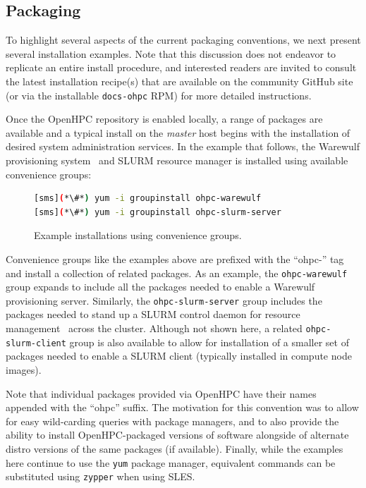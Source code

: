 \documentclass{sig-alternate-05-2015}
\begin{document}
\subsection{Packaging} \label{sec:packaging}

To highlight several aspects of the current packaging conventions, we next
present several installation examples. Note that this
discussion does not endeavor to replicate an entire install procedure, and
interested readers are invited to consult the latest installation recipe(s) that
are available on the community GitHub site (or via the installable
\texttt{docs-ohpc} RPM) for more detailed instructions.

Once the OpenHPC repository is enabled locally, a range of packages are
available and a typical install on the {\em master} host begins with the
installation of desired system administration services. In the example that
follows, the Warewulf provisioning system~\cite{warewulf_url} and SLURM
resource manager is installed using available convenience groups:

\begin{figure}[h]
\begin{lstlisting}[language=bash,keywords={}]
[sms](*\#*) yum -i groupinstall ohpc-warewulf
[sms](*\#*) yum -i groupinstall ohpc-slurm-server
\end{lstlisting}
\vspace*{-0.3cm}
  \caption{Example installations using convenience groups.}
    \label{fig:grouplinstall}
\end{figure}
  
Convenience groups like the examples above are prefixed with the ``ohpc-'' tag
and install a collection of related packages. As an example, the
\texttt{ohpc-warewulf} group expands to include all the packages needed to
enable a Warewulf provisioning server. Similarly, the
\texttt{ohpc-slurm-server} group includes the packages needed to stand up a
SLURM control daemon for resource management~\cite{Jette02slurm:simple} across
the cluster.  Although not shown here, a related \texttt{ohpc-slurm-client}
group is also available to allow for installation of a smaller set of packages
needed to enable a SLURM client (typically installed in compute node images).

Note that individual packages provided via OpenHPC have their names appended
with the ``ohpc'' suffix.  The motivation for this convention was to allow for
easy wild-carding queries with package managers, and to also provide the
ability to install OpenHPC-packaged versions of software alongside of alternate
distro versions of the same packages (if available).  Finally, while the
examples here continue to use the \texttt{yum} package manager, equivalent
commands can be substituted using \texttt{zypper} when using SLES.  \\
\end{document}
